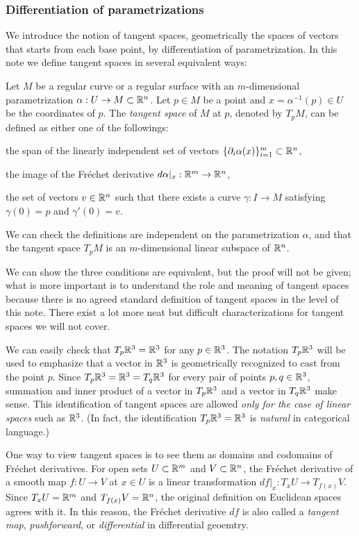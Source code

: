 \documentclass{../exp}
\def\a{\alpha}
\begin{document}
\subsubsection{Differentiation of parametrizations}
We introduce the notion of tangent spaces, geometrically the spaces of vectors that starts from each base point, by differentiation of parametrization.
In this note we define tangent spaces in several equivalent ways:
\begin{defn}
Let $M$ be a regular curve or a regular surface with an $m$-dimensional parametrization $\a:U\to M\subset\R^n$.
Let $p\in M$ be a point and $x=\a^{-1}(p)\in U$ be the coordinates of $p$.
The \emph{tangent space} of $M$ at $p$, denoted by $T_pM$, can be defined as either one of the followings:
\begin{cond}
\item the span of the linearly independent set of vectors $\{\pd_i\a(x)\}_{i=1}^m\subset\R^n$,
\item the image of the Fr\'echet derivative $d\a|_x:\R^m\to\R^n$,
\item the set of vectors $v\in\mathbb{R}^n$ such that there exists a curve $\gamma:I\to M$ satisfying $\gamma(0)=p$ and $\gamma'(0)=v$.
\end{cond}
We can check the definitions are independent on the parametrization $\a$, and that the tangent space $T_pM$ is an $m$-dimensional linear subspace of $\mathbb{R}^n$.
\end{defn}
\begin{rmk}
We can show the three conditions are equivalent, but the proof will not be given; what is more important is to understand the role and meaning of tangent spaces because there is no agreed standard definition of tangent spaces in the level of this note.
There exist a lot more neat but difficult characterizations for tangent spaces we will not cover.
\end{rmk}
\begin{rmk}
We can easily check that $T_p\mathbb{R}^3=\mathbb{R}^3$ for any $p\in\mathbb{R}^3$.
The notation $T_p\mathbb{R}^3$ will be used to emphasize that a vector in $\mathbb{R}^3$ is geometrically recognized to cast from the point $p$.
Since $T_p\mathbb{R}^3=\mathbb{R}^3=T_q\mathbb{R}^3$ for every pair of points $p,q\in\mathbb{R}^3$, summation and inner product of a vector in $T_p\mathbb{R}^3$ and a vector in $T_q\mathbb{R}^3$ make sense.
This identification of tangent spaces are allowed \emph{only for the case of linear spaces} such as $\mathbb{R}^3$.
(In fact, the identification $T_p\mathbb{R}^3=\mathbb{R}^3$ is \emph{natural} in categorical language.)
\end{rmk}
\begin{rmk}
One way to view tangent spaces is to see them as domains and codomains of Fr\'echet derivatives.
For open sets $U\subset\mathbb{R}^m$ and $V\subset\mathbb{R}^n$, the Fr\'echet derivative of a smooth map $f:U\to V$ at $x\in U$ is a linear transformation $df|_x:T_xU\to T_{f(x)}V$.
Since $T_xU=\mathbb{R}^m$ and $T_{f(x)}V=\mathbb{R}^n$, the original definition on Euclidean spaces agrees with it.
In this reason, the Fr\'echet derivative $df$ is also called a \emph{tangent map}, \emph{pushforward}, or \emph{differential} in differential geoemtry.
\end{rmk}
\end{document}
